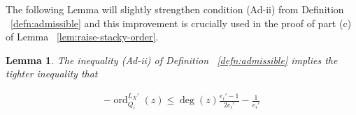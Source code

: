 \documentclass{amsart}
\theoremstyle{plain}
\newtheorem{lem}[thm]{Lemma}
\theoremstyle{definition}
\theoremstyle{remark}
\numberwithin{equation}{section}
\newcommand\BN{{\mathbb N}}
\newcommand \sx{\mathscr X}
\DeclareMathOperator{\ord}{ord}
\newcommand \subhalf[1]{\frac{{#1} - 1}{2{#1}}}
\newcommand{\halfcan}{L}
\begin{document}
%

The following Lemma will slightly strengthen condition (Ad-ii) from Definition ~\ref{defn:admissible} and this improvement is crucially used in the proof of part (c) of Lemma ~\ref{lem:raise-stacky-order}.

\begin{lem}
\label{lem:admissible_inequality}
The inequality (Ad-ii) of Definition ~\ref{defn:admissible} implies the
tighter inequality that

\begin{align*}
	-\ord_{Q_i}
^{\halfcan_X'}(z) \leq \deg(z) \subhalf{e_i'} -\frac{1}{e_i'}
\end{align*}
\end{lem}
\end{document}
